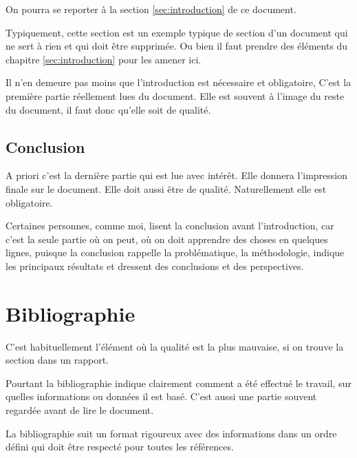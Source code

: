 On pourra se reporter à la section \ref{sec:introduction} de ce document.

Typiquement, cette section est un exemple typique de section d'un document qui ne sert à rien et qui doit être supprimée.
Ou bien il faut prendre des éléments du chapitre \ref{sec:introduction} pour les amener ici.

Il n'en demeure pas moins que l'introduction est nécessaire et obligatoire, C'est la première partie réellement lues du document.
Elle est souvent à l'image du reste du document, il faut donc qu'elle soit de qualité.

\subsection{Conclusion}

A priori c'est la dernière partie qui est lue avec intérêt. Elle donnera l'impression finale sur le document. Elle doit aussi être de qualité.
Naturellement elle est obligatoire.

Certaines personnes, comme moi, lisent la conclusion avant l'introduction, car c'est la seule partie où on peut, où on doit apprendre
des choses en quelques lignes, puisque la conclusion rappelle la problématique, la méthodologie, indique les principaux résultats et dressent
des conclusions et des perspectives.




\section{Bibliographie}

C'est habituellement l'élément où la qualité est la plus mauvaise, si on trouve la section dans un rapport.

Pourtant la bibliographie indique clairement comment a été effectué le travail, sur quelles informations ou données il est basé. C'est aussi une
partie souvent regardée avant de lire le document. 

La bibliographie suit un format rigoureux avec des informations dans un ordre défini qui doit être respecté pour toutes les références.

